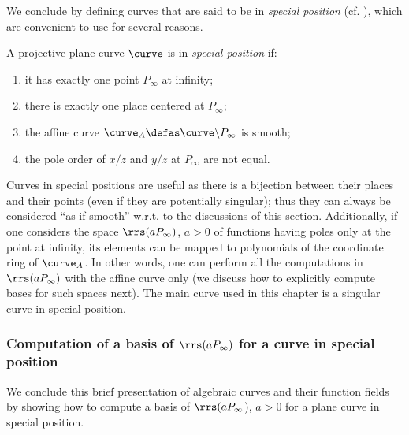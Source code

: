 We conclude by defining curves that are said to be in \emph{special position} (cf. \eg \cite{DBLP:journals/tit/SaintsH95}), which are convenient to use for several reasons.

\begin{defi}
A projective plane curve $\curve$ is in \emph{special position} if:
\begin{enumerate}
\item it has exactly one point $P_\infty$ at infinity;
\item there is exactly one place centered at $P_\infty$;
\item the affine curve $\curve_A \defas \curve\backslash P_\infty$ is smooth;
\item the pole order of $x/z$ and $y/z$ at $P_\infty$ are not equal.
\end{enumerate}
\end{defi}

Curves in special positions are useful as there is a bijection between their places and their points (even if they are potentially singular); thus they can always be considered
``as if smooth'' w.r.t. to the discussions of this section. Additionally, if one considers the space $\rrs(aP_\infty)$, $a > 0$ of functions having poles only at the point at infinity,
its elements can be mapped to polynomials of the coordinate ring of $\curve_A$. In other words, one can perform all the computations in $\rrs(aP_\infty)$ with the affine curve
only (we discuss how to explicitly compute bases for such spaces next). The main curve used in this chapter is a singular curve in special position.

\subsubsection{Computation of a basis of $\rrs(aP_\infty)$ for a curve in special position}

We conclude this brief presentation of algebraic curves and their function fields by showing how to compute a basis of $\rrs(aP_\infty$), $a > 0$
for a plane curve in special position.

